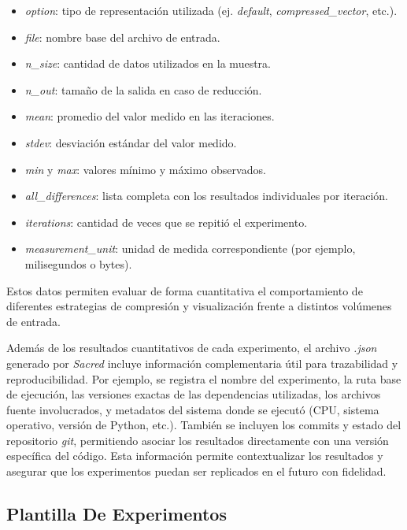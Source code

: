 \begin{itemize}
    \item \textit{option}: tipo de representación utilizada (ej. \textit{default}, \textit{compressed\_vector}, etc.).
    \item \textit{file}: nombre base del archivo de entrada.
    \item \textit{n\_size}: cantidad de datos utilizados en la muestra.
    \item \textit{n\_out}: tamaño de la salida en caso de reducción.
    \item \textit{mean}: promedio del valor medido en las iteraciones.
    \item \textit{stdev}: desviación estándar del valor medido.
    \item \textit{min} y \textit{max}: valores mínimo y máximo observados.
    \item \textit{all\_differences}: lista completa con los resultados individuales por iteración.
    \item \textit{iterations}: cantidad de veces que se repitió el experimento.
    \item \textit{measurement\_unit}: unidad de medida correspondiente (por ejemplo, milisegundos o bytes).
\end{itemize}

Estos datos permiten evaluar de forma cuantitativa el comportamiento de diferentes estrategias de compresión y visualización frente a distintos volúmenes de entrada.

Además de los resultados cuantitativos de cada experimento, el archivo \textit{.json} generado por \textit{Sacred} incluye información complementaria útil para trazabilidad y reproducibilidad. Por ejemplo, se registra el nombre del experimento, la ruta base de ejecución, las versiones exactas de las dependencias utilizadas, los archivos fuente involucrados, y metadatos del sistema donde se ejecutó (CPU, sistema operativo, versión de Python, etc.). También se incluyen los commits y estado del repositorio \textit{git}, permitiendo asociar los resultados directamente con una versión específica del código. Esta información permite contextualizar los resultados y asegurar que los experimentos puedan ser replicados en el futuro con fidelidad.

\subsection{Plantilla De Experimentos}

